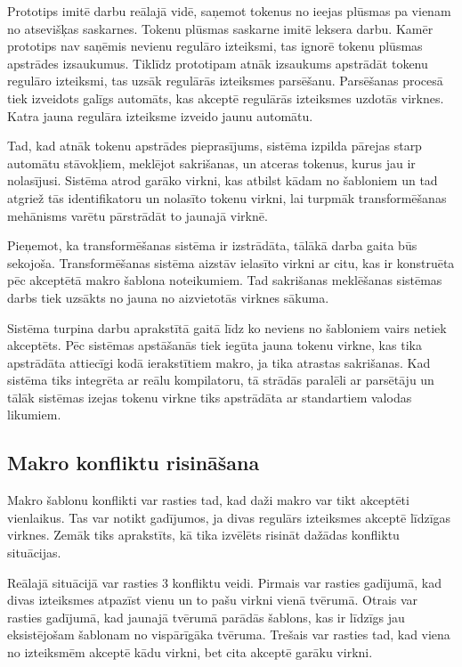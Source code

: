 Prototips imitē darbu reālajā vidē, saņemot tokenus no ieejas plūsmas pa vienam no atsevišķas saskarnes. Tokenu plūsmas saskarne imitē leksera darbu. Kamēr prototips nav saņēmis nevienu regulāro izteiksmi, tas ignorē tokenu plūsmas apstrādes izsaukumus. Tiklīdz prototipam atnāk izsaukums apstrādāt tokenu regulāro izteiksmi, tas uzsāk regulārās izteiksmes parsēšanu. Parsēšanas procesā tiek izveidots galīgs automāts, kas akceptē regulārās izteiksmes uzdotās virknes. Katra jauna regulāra izteiksme izveido jaunu automātu.

Tad, kad atnāk tokenu apstrādes pieprasījums, sistēma izpilda pārejas starp automātu stāvokļiem, meklējot sakrišanas, un atceras tokenus, kurus jau ir nolasījusi. Sistēma atrod garāko virkni, kas atbilst kādam no šabloniem un tad atgriež tās identifikatoru un nolasīto tokenu virkni, lai turpmāk transformēšanas mehānisms varētu pārstrādāt to jaunajā virknē.

Pieņemot, ka transformēšanas sistēma ir izstrādāta, tālākā darba gaita būs sekojoša. Transformēšanas sistēma aizstāv ielasīto virkni ar citu, kas ir konstruēta pēc akceptētā makro šablona noteikumiem. Tad sakrišanas meklēšanas sistēmas darbs tiek uzsākts no jauna no aizvietotās virknes sākuma.

Sistēma turpina darbu aprakstītā gaitā līdz ko neviens no šabloniem vairs netiek akceptēts. Pēc sistēmas apstāšanās tiek iegūta jauna tokenu virkne, kas tika apstrādāta attiecīgi kodā ierakstītiem makro, ja tika atrastas sakrišanas. Kad sistēma tiks integrēta ar reālu kompilatoru, tā strādās paralēli ar parsētāju un tālāk sistēmas izejas tokenu virkne tiks apstrādāta ar standartiem valodas likumiem.

\subsection{\label{sbs:sol_conflictresolving}Makro konfliktu risināšana}
Makro šablonu konflikti var rasties tad, kad daži makro var tikt akceptēti vienlaikus. Tas var notikt gadījumos, ja divas regulārs izteiksmes akceptē līdzīgas virknes. Zemāk tiks aprakstīts, kā tika izvēlēts risināt dažādas konfliktu situācijas. 

Reālajā situācijā var rasties 3 konfliktu veidi. Pirmais var rasties gadījumā, kad divas izteiksmes atpazīst vienu un to pašu virkni vienā tvērumā. Otrais var rasties gadījumā, kad jaunajā tvērumā parādās šablons, kas ir līdzīgs jau eksistējošam šablonam no vispārīgāka tvēruma. Trešais var rasties tad, kad viena no izteiksmēm akceptē kādu virkni, bet cita akceptē garāku virkni.

